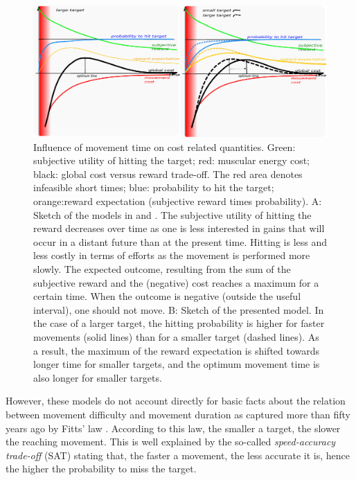 \documentclass[10pt]{article}
\begin{document}
\begin{figure}[hbt]
\centering
	\includegraphics[width=1.0\columnwidth]{images/canu_fig3.pdf}
\caption{Influence of movement time on cost related quantities.
Green: subjective utility of hitting the target; red: muscular energy cost; black: global cost versus reward trade-off. The red area denotes infeasible short times; blue: probability to hit the target; orange:reward expectation (subjective reward times probability).
 A: Sketch of the models in \cite{shadmehr10} and \cite{rigoux12}.
The subjective utility of hitting the reward decreases over time as one is less interested in gains that will occur in a distant future than at the present time. Hitting is less and less costly in terms of efforts as the movement is performed more slowly.
The expected outcome, resulting from the sum of the subjective reward and the (negative) cost reaches a maximum for a certain time. When the outcome is negative (outside the useful interval), one should not move.
B: Sketch of the presented model.
In the case of a larger target, the hitting probability is higher for faster movements (solid lines) than for a smaller target (dashed lines). As a result, the maximum of the reward expectation is shifted towards longer time for smaller targets, and the optimum movement time is also longer for smaller targets.\label{fig:mvt_acc}}
\end{figure}

However, these models do not account directly for basic facts about the relation between movement difficulty and movement duration as captured more than fifty years ago by Fitts' law \cite{fitts54_JEP}.
According to this law, the smaller a target, the slower the reaching movement. 
This is well explained by the so-called {\em speed-accuracy trade-off} (SAT) stating that, the faster a movement, the less accurate it is, hence the higher the probability to miss the target. 
\end{document}
